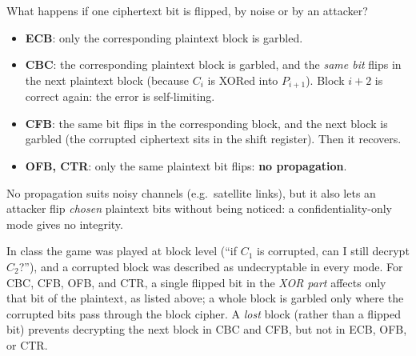 What happens if one ciphertext bit is flipped, by noise or by an attacker?
\begin{itemize}
    \item \textbf{ECB}: only the corresponding plaintext block is garbled.
    \item \textbf{CBC}: the corresponding plaintext block is garbled, and the \emph{same bit} flips in the next plaintext block (because $C_i$ is XORed into $P_{i+1}$). Block $i+2$ is correct again: the error is self-limiting.
    \item \textbf{CFB}: the same bit flips in the corresponding block, and the next block is garbled (the corrupted ciphertext sits in the shift register). Then it recovers.
    \item \textbf{OFB, CTR}: only the same plaintext bit flips: \textbf{no propagation}.
\end{itemize}
No propagation suits noisy channels (e.g.\ satellite links), but it also lets an attacker flip \emph{chosen} plaintext bits without being noticed: a confidentiality-only mode gives no integrity.

\begin{remark}
In class the game was played at block level (\enquote{if $C_1$ is corrupted, can I still decrypt $C_2$?}), and a corrupted block was described as undecryptable in every mode. For CBC, CFB, OFB, and CTR, a single flipped bit in the \emph{XOR part} affects only that bit of the plaintext, as listed above; a whole block is garbled only where the corrupted bits pass through the block cipher. A \emph{lost} block (rather than a flipped bit) prevents decrypting the next block in CBC and CFB, but not in ECB, OFB, or CTR.
\end{remark}

